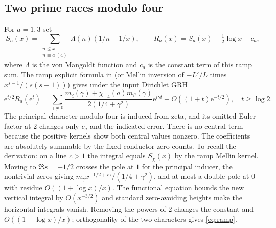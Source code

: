 \documentclass[11pt]{article}
\theoremstyle{remark}\newtheorem{remark}[theorem]{Remark}
\newcommand{\e}{\mathrm e}
\begin{document}
\subsection{Two prime races modulo four}
For $a=1,3$ set
\[
 S_a(x)=\sum_{\substack{n\le x\\ n\equiv a\ (4)}}\Lambda(n)(1/n-1/x),\qquad R_a(x)=S_a(x)-\tfrac12\log x-c_a,
\]
where $\Lambda$ is the von Mangoldt function and $c_a$ is the constant term of this ramp sum. The ramp explicit formula in \cite[\texttt{zer:lem:ramp}, \texttt{zer:eq:Zexp}]{zer} (or Mellin inversion of $-L'/L$ times $x^{s-1}/(s(s-1))$) gives under the input Dirichlet GRH
\begin{equation}\label{eq:ramp}
 \e^{t/2}R_a(\e^t)=\sum_{\gamma\ne0}\frac{m_\zeta(\gamma)+\chi_{-4}(a)m_\beta(\gamma)}{2(1/4+\gamma^2)}\e^{i\gamma t}+O((1+t)\e^{-t/2}),\quad t\ge\log2.
\end{equation}
The principal character modulo four is induced from zeta, and its omitted Euler factor at $2$ changes only $c_a$ and the indicated error. There is no central term because the positive kernels show both central values nonzero. The coefficients are absolutely summable by the fixed-conductor zero counts. To recall the derivation: on a line $c>1$ the integral equals $S_\chi(x)$ by the ramp Mellin kernel. Moving to $\Re s=-1/2$ crosses the pole at $1$ for the principal inducer, the nontrivial zeros giving $m_\gamma x^{-1/2+i\gamma}/(1/4+\gamma^2)$, and at most a double pole at $0$ with residue $O((1+\log x)/x)$. The functional equation bounds the new vertical integral by $O(x^{-3/2})$ and standard zero-avoiding heights make the horizontal integrals vanish. Removing the powers of $2$ changes the constant and $O((1+\log x)/x)$; orthogonality of the two characters gives \eqref{eq:ramp}.
\end{document}
